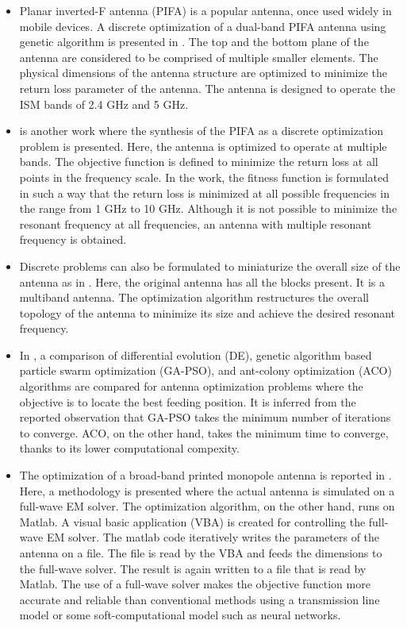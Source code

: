 \begin{itemize}
\item Planar inverted-F antenna (PIFA) is a popular antenna, once used widely in mobile devices. A discrete optimization of a dual-band PIFA antenna using genetic algorithm is presented in \cite{opt_pifa_ga_2}. The top and the bottom plane of the antenna are considered to be comprised of multiple smaller elements. The physical dimensions of the antenna structure are optimized to minimize the return loss parameter of the antenna. The antenna is designed to operate the ISM bands of 2.4 GHz and 5 GHz.
\item \cite{opt_pifa_ga} is another work where the synthesis of the PIFA as a discrete optimization problem is presented. Here, the antenna is optimized to operate at multiple bands. The objective function is defined to minimize the return loss at all points in the frequency scale. In the work, the fitness function is formulated in such a way that the return loss is minimized at all possible frequencies in the range from 1 GHz to 10 GHz. Although it is not possible to minimize the resonant frequency at all frequencies, an antenna with multiple resonant frequency is obtained.
\item Discrete problems can also be formulated to miniaturize the overall size of the antenna as in \cite{rectpatch_miniaturize_ga}. Here, the original antenna has all the blocks present. It is a multiband antenna. The optimization algorithm restructures the overall topology of the antenna to minimize its size and achieve the desired resonant frequency.
\item In \cite{compCAD4Ant}, a comparison of differential evolution (DE), genetic algorithm based particle swarm optimization (GA-PSO), and ant-colony optimization (ACO) algorithms are compared for antenna optimization problems where the objective is to locate the best feeding position. It is inferred from the reported observation that GA-PSO takes the minimum number of iterations to converge. ACO, on the other hand, takes the minimum time to converge, thanks to its lower computational compexity.
\item The optimization of a broad-band printed monopole antenna is reported in \cite{auto_opt_matlab}. Here, a methodology is presented where the actual antenna is simulated on a full-wave EM solver. The optimization algorithm, on the other hand, runs on Matlab. A visual basic application (VBA) is created for controlling the full-wave EM solver. The matlab code iteratively writes the parameters of the antenna on a file. The file is read by the VBA and feeds the dimensions to the full-wave solver. The result is again written to a file that is read by Matlab. The use of a full-wave solver makes the objective function more accurate and reliable than conventional methods using a transmission line model or some soft-computational model such as neural networks.
\end{itemize}

